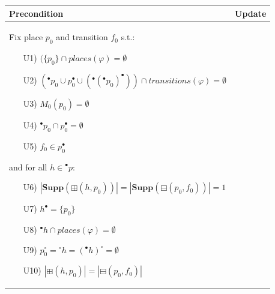\begin{figure}
    \vspace{5mm}
    \begin{adjustbox}{center}
        \begin{tabular}{|p{70mm}|p{70mm}|} \hline
        Precondition & Update \\ \hline
        Fix place $p_0$ and transition $f_0$ s.t.:
        \begin{itemize}[leftmargin=10mm]
            \item[U1)] $(\{p_0\} \cap places(\varphi) = \emptyset$
            \item[U2)] $({}^\bullet p_0 \cup p_0^\bullet \cup ({}^\bullet ({}^\bullet p_0)^\bullet)) \cap transitions(\varphi) = \emptyset$
            \item[U3)] $M_0(p_0)=\emptyset$
            \item[U4)] $^\bullet p_0 \cap p_0^\bullet = \emptyset$
            \item[U5)] $f_0 \in p_0^\bullet$
        \end{itemize}
        \hspace{2mm}
        and for all $h\in{}^\bullet p$:
        \begin{itemize}[leftmargin=10mm]
            \item[U6)] $|\textbf{Supp}(\boxplus(h, p_0))| = |\textbf{Supp}(\boxminus(p_0, f_0))| = 1$
            \item[U7)] $h^\bullet=\{p_0\}$
            \item[U8)] ${}^\bullet h \cap places(\varphi) = \emptyset$
            \item[U9)] $p_0^\circ = {}^\circ h = ({}^\bullet h)^\circ = \emptyset$
            \item[U10)] $|\boxplus(h, p_0)| = |\boxminus(p_0, f_0)|$

\end{itemize}
\end{tabular}
\end{adjustbox}
\end{figure}

